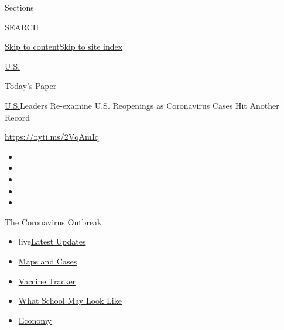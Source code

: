 Sections

SEARCH

\protect\hyperlink{site-content}{Skip to
content}\protect\hyperlink{site-index}{Skip to site index}

\href{https://www.nytimes.com/section/us}{U.S.}

\href{https://myaccount.nytimes.com/auth/login?response_type=cookie\&client_id=vi}{}

\href{https://www.nytimes.com/section/todayspaper}{Today's Paper}

\href{/section/us}{U.S.}\textbar{}Leaders Re-examine U.S. Reopenings as
Coronavirus Cases Hit Another Record

\url{https://nyti.ms/2VqAmIq}

\begin{itemize}
\item
\item
\item
\item
\item
\end{itemize}

\href{https://www.nytimes.com/news-event/coronavirus?action=click\&pgtype=Article\&state=default\&region=TOP_BANNER\&context=storylines_menu}{The
Coronavirus Outbreak}

\begin{itemize}
\tightlist
\item
  live\href{https://www.nytimes.com/2020/08/01/world/coronavirus-covid-19.html?action=click\&pgtype=Article\&state=default\&region=TOP_BANNER\&context=storylines_menu}{Latest
  Updates}
\item
  \href{https://www.nytimes.com/interactive/2020/us/coronavirus-us-cases.html?action=click\&pgtype=Article\&state=default\&region=TOP_BANNER\&context=storylines_menu}{Maps
  and Cases}
\item
  \href{https://www.nytimes.com/interactive/2020/science/coronavirus-vaccine-tracker.html?action=click\&pgtype=Article\&state=default\&region=TOP_BANNER\&context=storylines_menu}{Vaccine
  Tracker}
\item
  \href{https://www.nytimes.com/interactive/2020/07/29/us/schools-reopening-coronavirus.html?action=click\&pgtype=Article\&state=default\&region=TOP_BANNER\&context=storylines_menu}{What
  School May Look Like}
\item
  \href{https://www.nytimes.com/live/2020/07/31/business/stock-market-today-coronavirus?action=click\&pgtype=Article\&state=default\&region=TOP_BANNER\&context=storylines_menu}{Economy}
\end{itemize}

